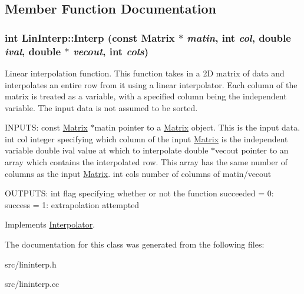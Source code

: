 \subsection{Member Function Documentation}
\hypertarget{classLinInterp_a26aeb03c387bf5c8ea5db0ed111b5cd7}{
\subsubsection[{Interp}]{\setlength{\rightskip}{0pt plus 5cm}int LinInterp::Interp (const {\bf Matrix} $\ast$ {\em matin}, \/  int {\em col}, \/  double {\em ival}, \/  double $\ast$ {\em vecout}, \/  int {\em cols})}}
\label{d8/dee/classLinInterp_a26aeb03c387bf5c8ea5db0ed111b5cd7}


Linear interpolation function. This function takes in a 2D matrix of data and interpolates an entire row from it using a linear interpolator. Each column of the matrix is treated as a variable, with a specified column being the independent variable. The input data is not assumed to be sorted.

INPUTS: const \hyperlink{classMatrix}{Matrix} $\ast$matin pointer to a \hyperlink{classMatrix}{Matrix} object. This is the input data. int col integer specifying which column of the input \hyperlink{classMatrix}{Matrix} is the independent variable double ival value at which to interpolate double $\ast$vecout pointer to an array which contains the interpolated row. This array has the same number of columns as the input \hyperlink{classMatrix}{Matrix}. int cols number of columns of matin/vecout

OUTPUTS: int flag specifying whether or not the function succeeded = 0: success = 1: extrapolation attempted 

Implements \hyperlink{classInterpolator_a2238defccb009047f624bda33cc47c73}{Interpolator}.

The documentation for this class was generated from the following files:\begin{DoxyCompactItemize}
\item 
src/lininterp.h\item 
src/lininterp.cc\end{DoxyCompactItemize}
